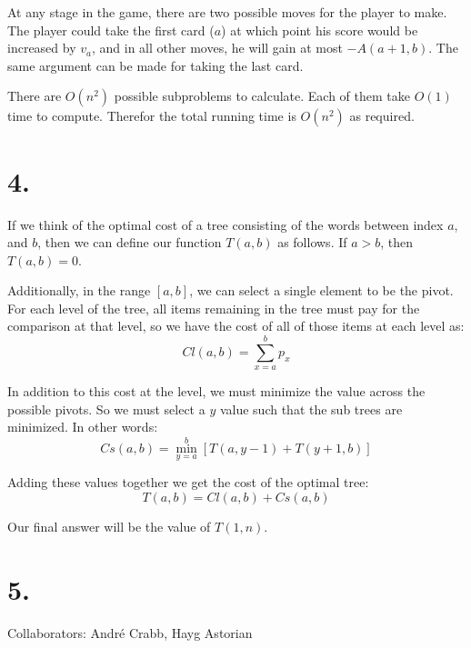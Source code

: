 \documentclass[11pt]{article}
\begin{document}
At any stage in the game, there are two possible moves for the player to make.
The player could take the first card ($a$) at which point his score would be
increased by $v_a$, and in all other moves, he will gain at most $-A(a+1, b)$.
The same argument can be made for taking the last card. 

There are $O(n^2)$ possible subproblems to calculate. Each of them take $O(1)$
time to compute. Therefor the total running time is $O(n^2)$ as required. 
\newpage
\section*{4.}
If we think of the optimal cost of a tree consisting of the words between index
$a$, and $b$, then we can define our function $T(a, b)$ as follows. If $a > b$,
then $T(a,b) = 0$. 

Additionally, in the range $[a,b]$, we can select a single element to be the
pivot. For each level of the tree, all items remaining in the tree must pay for
the comparison at that level, so we have the cost of all of those items at each
level as:
\begin{equation*}
Cl(a, b) = \sum_{x=a}^{b} p_x
\end{equation*}

In addition to this cost at the level, we must minimize the value across the
possible pivots.  So we must select a $y$ value such that the sub trees are
minimized. In other words:
\begin{equation*}
Cs(a, b) = \min_{y=a}^{b} [T(a, y-1) + T(y+1, b)]
\end{equation*}

Adding these values together we get the cost of the optimal tree:
\begin{equation*}
T(a, b) = Cl(a,b) + Cs(a,b)
\end{equation*}

Our final answer will be the value of $T(1, n)$.
\newpage
\section*{5.}
Collaborators: Andr\'e Crabb, Hayg Astorian
\end{document}
